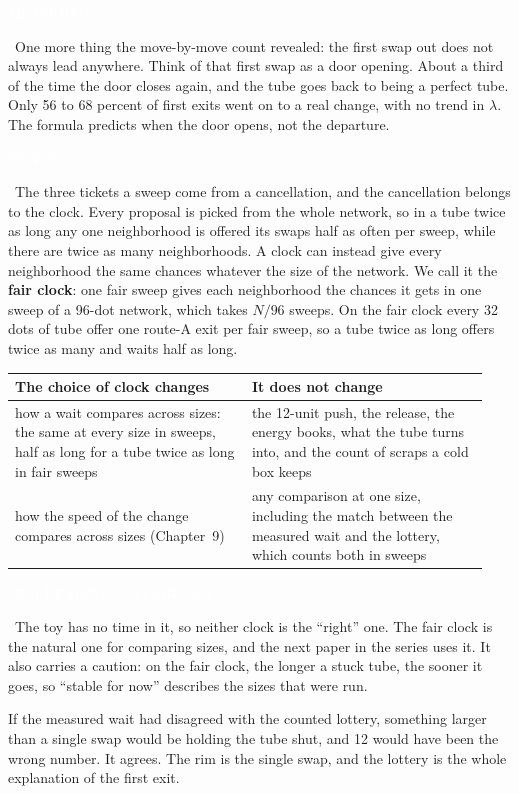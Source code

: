\documentclass[11pt,letterpaper]{article}
\newcommand{\whyhere}[1]{\par\medskip\noindent{\color{accent}\small\textbf{Why we went here.}} {\small #1}\par\medskip}
\newcommand{\sub}[1]{\par\medskip{\color{ink}\large\bfseries #1}\par}
\newcommand{\tagbox}[2]{{\sffamily\scriptsize\colorbox{#1}{\textcolor{white}{\strut #2}}}}
\newcommand{\Exact}{\tagbox{kExact}{EXACT}}
\newcommand{\Meas}{\tagbox{kMeas}{MEASURED}}
\newcommand{\Ours}{\tagbox{kOurs}{OUR READING, UNVERIFIED}}
\begin{document}
\Meas\ One more thing the move-by-move count revealed: the first swap out does not always lead
anywhere. Think of that first swap as a door opening. About a third of the time the door closes again,
and the tube goes back to being a perfect tube. Only 56 to 68 percent of first exits went on to a real
change, with no trend in $\lambda$. The formula predicts when the door opens, not the departure.

\sub{Two clocks}
\Exact\ The three tickets a sweep come from a cancellation, and the cancellation belongs to the clock.
Every proposal is picked from the whole network, so in a tube twice as long any one neighborhood is
offered its swaps half as often per sweep, while there are twice as many neighborhoods. A clock can
instead give every neighborhood the same chances whatever the size of the network. We call it the
\textbf{fair clock}: one fair sweep gives each neighborhood the chances it gets in one sweep of a
96-dot network, which takes $N/96$ sweeps. On the fair clock every 32 dots of tube offer one route-A
exit per fair sweep, so a tube twice as long offers twice as many and waits half as long.

\begin{center}
\renewcommand{\arraystretch}{1.15}
\begin{tabular}{@{}p{0.47\linewidth}p{0.47\linewidth}@{}}
\toprule
The choice of clock changes & It does not change \\
\midrule
how a wait compares across sizes: the same at every size in sweeps, half as long for a tube twice as
long in fair sweeps & the 12-unit push, the release, the energy books, what the tube turns into, and
the count of scraps a cold box keeps \\
how the speed of the change compares across sizes (Chapter~9) & any comparison at one size, including
the match between the measured wait and the lottery, which counts both in sweeps \\
\bottomrule
\end{tabular}
\end{center}

\Ours\ The toy has no time in it, so neither clock is the ``right'' one. The fair clock is the natural
one for comparing sizes, and the next paper in the series uses it. It also carries a caution: on the
fair clock, the longer a stuck tube, the sooner it goes, so ``stable for now'' describes the sizes that
were run.

\whyhere{If the measured wait had disagreed with the counted lottery, something larger than a single
swap would be holding the tube shut, and 12 would have been the wrong number. It agrees. The rim is the
single swap, and the lottery is the whole explanation of the first exit.}
\end{document}
